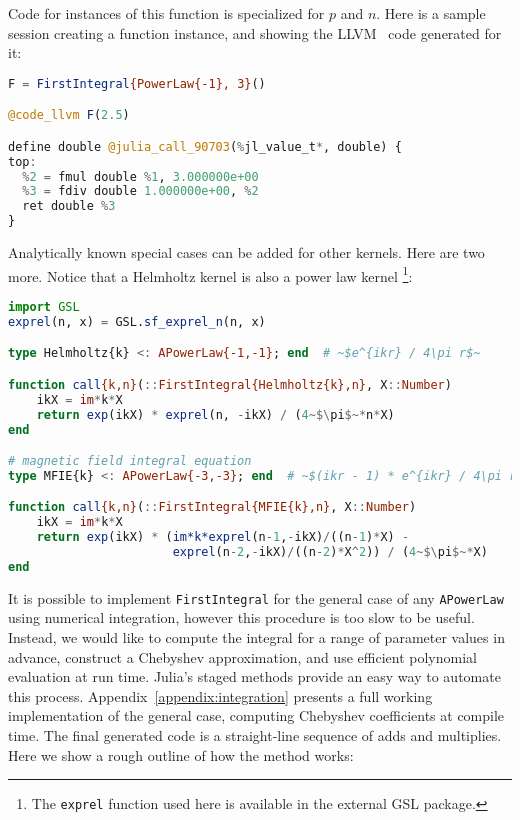 Code for instances of this function is specialized for $p$ and $n$.
Here is a sample session creating a function instance, and showing the
LLVM~\cite{LLVM} code generated for it:

\begin{singlespace}
\begin{lstlisting}[language=julia]
F = FirstIntegral{PowerLaw{-1}, 3}()

@code_llvm F(2.5)

define double @julia_call_90703(%jl_value_t*, double) {
top:
  %2 = fmul double %1, 3.000000e+00
  %3 = fdiv double 1.000000e+00, %2
  ret double %3
}
\end{lstlisting}
\end{singlespace}

Analytically known special cases can be added for other kernels.
Here are two more.
Notice that a Helmholtz kernel is also a power law kernel
\footnote{The \texttt{exprel} function used here is available in the
external GSL package.}:

\begin{singlespace}
\begin{lstlisting}[language=julia]
import GSL
exprel(n, x) = GSL.sf_exprel_n(n, x)

type Helmholtz{k} <: APowerLaw{-1,-1}; end  # ~$e^{ikr} / 4\pi r$~

function call{k,n}(::FirstIntegral{Helmholtz{k},n}, X::Number)
    ikX = im*k*X
    return exp(ikX) * exprel(n, -ikX) / (4~$\pi$~*n*X)
end

# magnetic field integral equation
type MFIE{k} <: APowerLaw{-3,-3}; end  # ~$(ikr - 1) * e^{ikr} / 4\pi r^3$~

function call{k,n}(::FirstIntegral{MFIE{k},n}, X::Number)
    ikX = im*k*X
    return exp(ikX) * (im*k*exprel(n-1,-ikX)/((n-1)*X) -
                       exprel(n-2,-ikX)/((n-2)*X^2)) / (4~$\pi$~*X)
end
\end{lstlisting}
\end{singlespace}

It is possible to implement \texttt{FirstIntegral} for the general
case of any \texttt{APowerLaw} using numerical integration, however
this procedure is too slow to be useful.
Instead, we would like to compute the integral for a range of
parameter values in advance, construct a Chebyshev approximation,
and use efficient polynomial evaluation at run time.
Julia's staged methods provide an easy way to automate this process.
Appendix~\ref{appendix:integration} presents a full working implementation of
the general case, computing Chebyshev coefficients at compile time.
The final generated code is a straight-line sequence of adds and multiplies.
Here we show a rough outline of how the method works:

